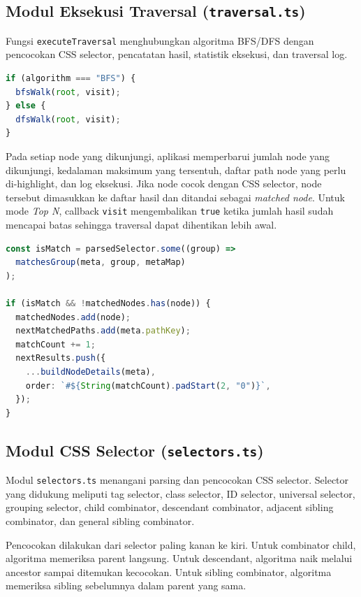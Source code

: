 \subsection{Modul Eksekusi Traversal (\texttt{traversal.ts})}

Fungsi \texttt{executeTraversal} menghubungkan algoritma BFS/DFS dengan pencocokan CSS selector, pencatatan hasil, statistik eksekusi, dan traversal log.

\begin{lstlisting}[language=TypeScript, caption={Pemilihan algoritma traversal}]
if (algorithm === "BFS") {
  bfsWalk(root, visit);
} else {
  dfsWalk(root, visit);
}
\end{lstlisting}

Pada setiap node yang dikunjungi, aplikasi memperbarui jumlah node yang dikunjungi, kedalaman maksimum yang tersentuh, daftar path node yang perlu di-highlight, dan log eksekusi. Jika node cocok dengan CSS selector, node tersebut dimasukkan ke daftar hasil dan ditandai sebagai \textit{matched node}. Untuk mode \textit{Top N}, callback \texttt{visit} mengembalikan \texttt{true} ketika jumlah hasil sudah mencapai batas sehingga traversal dapat dihentikan lebih awal.

\begin{lstlisting}[language=TypeScript, caption={Pencatatan node yang cocok dengan selector}]
const isMatch = parsedSelector.some((group) =>
  matchesGroup(meta, group, metaMap)
);

if (isMatch && !matchedNodes.has(node)) {
  matchedNodes.add(node);
  nextMatchedPaths.add(meta.pathKey);
  matchCount += 1;
  nextResults.push({
    ...buildNodeDetails(meta),
    order: `#${String(matchCount).padStart(2, "0")}`,
  });
}
\end{lstlisting}

\subsection{Modul CSS Selector (\texttt{selectors.ts})}

Modul \texttt{selectors.ts} menangani parsing dan pencocokan CSS selector. Selector yang didukung meliputi tag selector, class selector, ID selector, universal selector, grouping selector, child combinator, descendant combinator, adjacent sibling combinator, dan general sibling combinator.

Pencocokan dilakukan dari selector paling kanan ke kiri. Untuk combinator child, algoritma memeriksa parent langsung. Untuk descendant, algoritma naik melalui ancestor sampai ditemukan kecocokan. Untuk sibling combinator, algoritma memeriksa sibling sebelumnya dalam parent yang sama.

